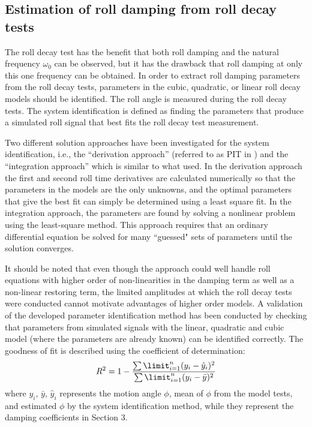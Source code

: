 \subsection{Estimation of roll damping from roll decay tests}
\label{se:experimental_estimation}
The roll decay test has the benefit that both roll damping and the natural frequency $\omega_0$ can be observed, but it has the drawback that roll damping at only this one frequency can be obtained. In order to extract roll damping parameters from the roll decay tests, parameters in the cubic, quadratic, or linear roll decay models should be identified. The roll angle is measured during the roll decay tests. The system identification is defined as finding the parameters that produce a simulated roll signal that best fits the roll decay test measurement. 

Two different solution approaches have been investigated for the system identification, i.e., the ``derivation approach'' (referred to as PIT in \parencite{imo_1200_2006}) and the ``integration approach'' which is similar to what \parencite{soder_assessment_2019} used. In the derivation approach the first and second roll time derivatives are calculated numerically so that the parameters in the models are the only unknowns, and the optimal parameters that give the best fit can simply be determined using a least square fit.
In the integration approach, the parameters are found by solving a nonlinear problem using the least-square method. This approach requires that an ordinary differential equation be solved for many ``guessed" sets of parameters until the solution converges.

It should be noted that even though the approach could well handle roll equations with higher order of non-linearities in the damping term as well as a non-linear restoring term, the limited amplitudes at which the roll decay tests were conducted cannot motivate advantages of higher order models. A validation of the developed parameter identification method has been conducted by checking that parameters from simulated signals with the linear, quadratic and cubic model  (where the parameters are already known) can be identified correctly. 
The goodness of fit is described using the coefficient of determination:
\begin{equation} \label{eq:R2}
R^2=1-\frac{\sum\limit_{i=1}^{n}(y_i-\hat{y}_i)^2}{\sum\limit_{i=1}^{n}(y_i-\bar{y})^2}
\end{equation}
where $y_i$, $\bar y$, $\hat{y}_i$ represents the motion angle $\phi$, mean of $\phi$ from the model tests, and estimated $\phi$ by the system identification method, while they represent the damping coefficients in  Section 3.      


